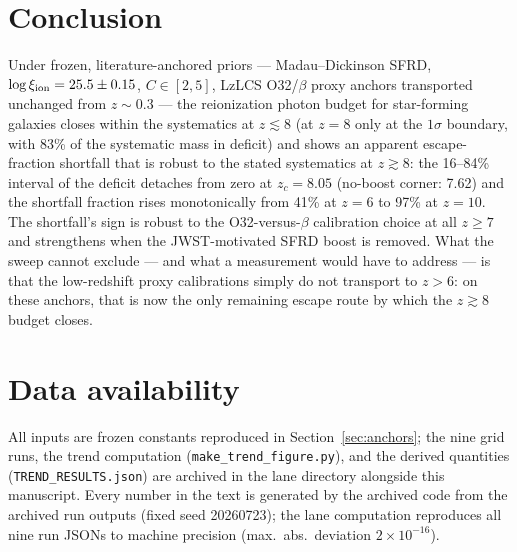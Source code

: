 \documentclass[twocolumn]{aastex702}
\begin{document}
\section{Conclusion}
Under frozen, literature-anchored priors --- Madau--Dickinson SFRD, $\log \xi_{\rm ion}=25.5\pm0.15$, $C\in[2,5]$, LzLCS O32/$\beta$ proxy anchors transported unchanged from $z\sim0.3$ --- the reionization photon budget for star-forming galaxies closes within the systematics at $z\lesssim8$ (at $z=8$ only at the $1\sigma$ boundary, with 83\% of the systematic mass in deficit) and shows an apparent escape-fraction shortfall that is robust to the stated systematics at $z\gtrsim8$: the 16--84\% interval of the deficit detaches from zero at $z_c=8.05$ (no-boost corner: 7.62) and the shortfall fraction rises monotonically from 41\% at $z=6$ to 97\% at $z=10$. The shortfall's sign is robust to the O32-versus-$\beta$ calibration choice at all $z\ge7$ and strengthens when the JWST-motivated SFRD boost is removed. What the sweep cannot exclude --- and what a measurement would have to address --- is that the low-redshift proxy calibrations simply do not transport to $z>6$: on these anchors, that is now the only remaining escape route by which the $z\gtrsim8$ budget closes.

\section*{Data availability}
All inputs are frozen constants reproduced in Section~\ref{sec:anchors}; the nine grid runs, the trend computation (\texttt{make\_trend\_figure.py}), and the derived quantities (\texttt{TREND\_RESULTS.json}) are archived in the lane directory alongside this manuscript. Every number in the text is generated by the archived code from the archived run outputs (fixed seed 20260723); the lane computation reproduces all nine run JSONs to machine precision (max.\ abs.\ deviation $2\times10^{-16}$).
\end{document}
